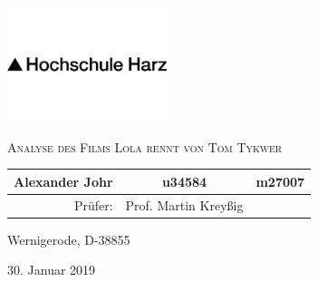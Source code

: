 

\pagestyle{empty}
\clearpage

\newcommand*{\titleUL}{\begingroup%
\begin{center}

\includegraphics[width=0.35\textwidth]{../img/hsharz/logo.png}

\LARGE{\textsc{Analyse des Films Lola rennt von Tom Tykwer}}
\vspace{0.8\baselineskip}

\vfill


\vfill

\normalsize


\begin{tabular}{r c l}
Alexander Johr & u34584 & m27007 \\
\hline
Prüfer: &  Prof. Martin Kreyßig & \\
\end{tabular}











\vfill

Wernigerode, D-38855

\large 
30. Januar 2019

\end{center}

\endgroup}

\titleUL
